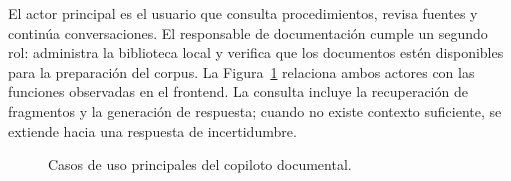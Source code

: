 El actor principal es el usuario que consulta procedimientos, revisa fuentes y continúa conversaciones. El responsable de
documentación cumple un segundo rol: administra la biblioteca local y verifica que los documentos estén disponibles para
la preparación del corpus. La Figura~\ref{fig:casos_uso} relaciona ambos actores con las funciones observadas en el
frontend. La consulta incluye la recuperación de fragmentos y la generación de respuesta; cuando no existe contexto
suficiente, se extiende hacia una respuesta de incertidumbre.

\begin{figure}[H]
\centering
{}
\caption{Casos de uso principales del copiloto documental.}
\label{fig:casos_uso}
\end{figure}

